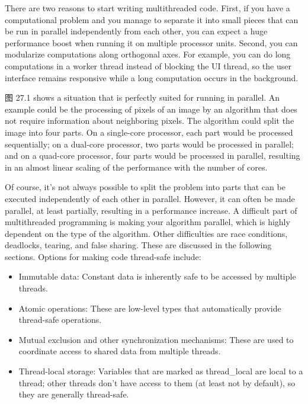 There are two reasons to start writing multithreaded code. First, if you have a computational problem and you manage to separate it into small pieces that can be run in parallel independently from each other, you can expect a huge performance boost when running it on multiple processor units. Second, you can modularize computations along orthogonal axes. For example, you can do long computations in a worker thread instead of blocking the UI thread, so the user interface remains responsive while a long computation occurs in the background.

图 27.1 shows a situation that is perfectly suited for running in parallel. An example could be the processing of pixels of an image by an algorithm that does not require information about neighboring pixels. The algorithm could split the image into four parts. On a single-core processor, each part would be processed sequentially; on a dual-core processor, two parts would be processed in parallel; and on a quad-core processor, four parts would be processed in parallel, resulting in an almost linear scaling of the performance with the number of cores.


Of course, it’s not always possible to split the problem into parts that can be executed independently of each other in parallel. However, it can often be made parallel, at least partially, resulting in a performance increase. A difficult part of multithreaded programming is making your algorithm parallel, which is highly dependent on the type of the algorithm. Other difficulties are race conditions, deadlocks, tearing, and false sharing. These are discussed in the following sections. Options for making code thread-safe include:

\begin{itemize}
\item
Immutable data: Constant data is inherently safe to be accessed by multiple threads.

\item
Atomic operations: These are low-level types that automatically provide thread-safe operations.

\item
Mutual exclusion and other synchronization mechanisms: These are used to coordinate access to shared data from multiple threads.

\item
Thread-local storage: Variables that are marked as thread\_local are local to a thread; other threads don’t have access to them (at least not by default), so they are generally thread-safe.
\end{itemize}

